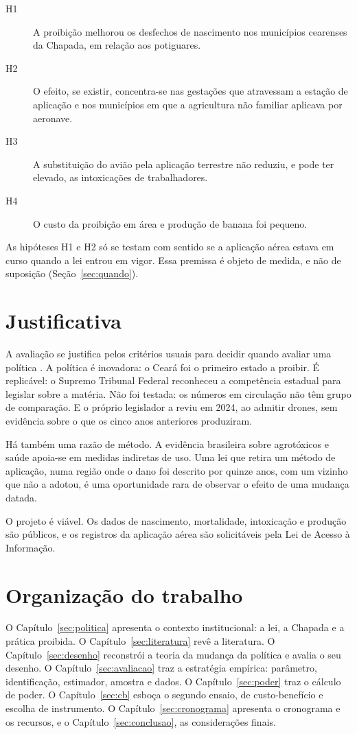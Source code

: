 \begin{description}
\item[H1] A proibição melhorou os desfechos de nascimento nos municípios
cearenses da Chapada, em relação aos potiguares.
\item[H2] O efeito, se existir, concentra-se nas gestações que atravessam a
estação de aplicação e nos municípios em que a agricultura não familiar aplicava
por aeronave.
\item[H3] A substituição do avião pela aplicação terrestre não reduziu, e pode
ter elevado, as intoxicações de trabalhadores.
\item[H4] O custo da proibição em área e produção de banana foi pequeno.
\end{description}

As hipóteses H1 e H2 só se testam com sentido se a aplicação aérea estava em
curso quando a lei entrou em vigor. Essa premissa é objeto de medida, e não de
suposição (Seção~\ref{sec:quando}).

\section{Justificativa}

A avaliação se justifica pelos critérios usuais para decidir quando avaliar uma
política \cite{gertler2016}. A política é inovadora: o Ceará foi o primeiro
estado a proibir. É replicável: o Supremo Tribunal Federal reconheceu a
competência estadual para legislar sobre a matéria. Não foi testada: os números
em circulação não têm grupo de comparação. E o próprio legislador a reviu em
2024, ao admitir drones, sem evidência sobre o que os cinco anos anteriores
produziram.

Há também uma razão de método. A evidência brasileira sobre agrotóxicos e
saúde apoia-se em medidas indiretas de uso. Uma lei que retira um método de
aplicação, numa região onde o dano foi descrito por quinze anos, com um vizinho
que não a adotou, é uma oportunidade rara de observar o efeito de uma mudança
datada.

O projeto é viável. Os dados de nascimento, mortalidade, intoxicação e produção
são públicos, e os registros da aplicação aérea são solicitáveis pela Lei de
Acesso à Informação.

\section{Organização do trabalho}

O Capítulo~\ref{sec:politica} apresenta o contexto institucional: a lei, a
Chapada e a prática proibida. O Capítulo~\ref{sec:literatura} revê a
literatura. O Capítulo~\ref{sec:desenho} reconstrói a teoria da mudança da
política e avalia o seu desenho. O Capítulo~\ref{sec:avaliacao} traz a
estratégia empírica: parâmetro, identificação, estimador, amostra e dados. O
Capítulo~\ref{sec:poder} traz o cálculo de poder. O Capítulo~\ref{sec:cb}
esboça o segundo ensaio, de custo-benefício e escolha de instrumento. O
Capítulo~\ref{sec:cronograma} apresenta o cronograma e os recursos, e o
Capítulo~\ref{sec:conclusao}, as considerações finais.
